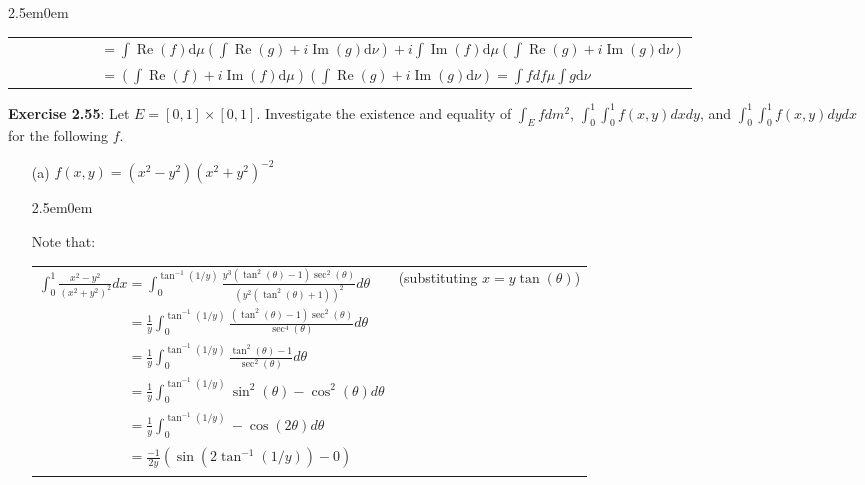 \documentclass{book}
\newcommand{\exTwoP}{%
   \color{RedViolet}%
   \fontsize{13}{15}\selectfont%
}
\newcommand{\exPPP}{%
   \color{VioletRed}%
   \fontsize{12}{14}\selectfont%
}
\newenvironment{myIndent}{%
   \begin{adjustwidth}{2.5em}{0em}%
}{%
   \end{adjustwidth}%
}
\newcommand{\blab}[1]{\textbf{#1}}
\newcommand{\df}{\mathrm{d}}
\DeclareMathOperator{\rea}{Re}
\DeclareMathOperator{\ima}{Im}
\newcommand{\retTwo}{\hfill\bigbreak}
\begin{document}
\begin{enumerate}
\begin{myIndent}
{\begin{tabular}{l}
			$\phantom{\int h \df(\mu \times \nu)} = \int \rea(f) \df \mu (\int \rea(g) + i\ima(g) \df \nu) + i \int \ima(f) \df \mu (\int \rea(g) + i \ima(g)\df \nu)$\\ [8pt]

			$\phantom{\int h \df(\mu \times \nu)} = (\int \rea(f) + i\ima(f) \df \mu)(\int \rea(g) + i \ima(g) \df \nu) = \int f df \mu \int g \df \nu$
		\end{tabular}\retTwo\par}
	\end{myIndent}
\end{enumerate}

\blab{Exercise 2.55}: Let $E = [0, 1] \times [0, 1]$. Investigate the existence and equality of $\int_E fdm^2$, $\int_0^1 \int_0^1 f(x, y)dxdy$, and $\int_0^1 \int_0^1 f(x, y)dydx$ for the following $f$.
\begin{enumerate}
	\item[(a)] $f(x, y) = (x^2 - y^2)(x^2 + y^2)^{-2}$

	\begin{myIndent}\exTwoP
		Note that:

		{\centering 
		\begin{tabular}{l l}
			$\int_0^1 \frac{x^2 - y^2}{(x^2 + y^2)^2}dx = \int_0^{\tan^{-1}(1/y)} \frac{y^3(\tan^2(\theta) - 1)\sec^2(\theta)}{(y^2(\tan^2(\theta) + 1))^2}d\theta$ & {\exPPP (substituting $x = y\tan(\theta)$)} \\ [8pt]

			$\phantom{\int_0^1 \frac{x^2 - y^2}{(x^2 + y^2)^2}dx} = \frac{1}{y}\int_0^{\tan^{-1}(1/y)} \frac{(\tan^2(\theta) - 1)\sec^2(\theta)}{\sec^4(\theta)}d\theta$\\ [8pt]

			$\phantom{\int_0^1 \frac{x^2 - y^2}{(x^2 + y^2)^2}dx} = \frac{1}{y}\int_0^{\tan^{-1}(1/y)} \frac{\tan^2(\theta) - 1}{\sec^2(\theta)}d\theta$\\ [8pt]

			$\phantom{\int_0^1 \frac{x^2 - y^2}{(x^2 + y^2)^2}dx} = \frac{1}{y}\int_0^{\tan^{-1}(1/y)} \sin^2(\theta) - \cos^2(\theta)d\theta$\\ [8pt]

			$\phantom{\int_0^1 \frac{x^2 - y^2}{(x^2 + y^2)^2}dx} = \frac{1}{y}\int_0^{\tan^{-1}(1/y)} -\cos(2\theta)d\theta$\\ [8pt]
			
			$\phantom{\int_0^1 \frac{x^2 - y^2}{(x^2 + y^2)^2}dx} = \frac{-1}{2y}(\sin(2\tan^{-1}(1/y)) - 0)$\\ [8pt]


\end{tabular}}
\end{myIndent}
\end{enumerate}
\end{document}
